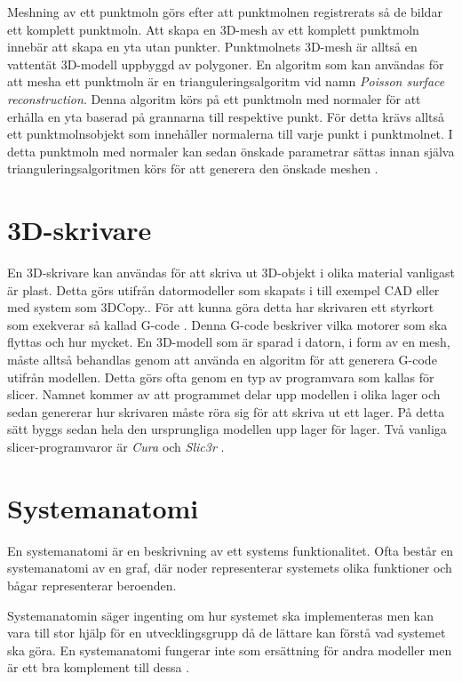 Meshning av ett punktmoln görs efter att punktmolnen registrerats så de bildar ett komplett punktmoln. Att skapa en 3D-mesh av ett komplett punktmoln innebär att skapa en yta utan punkter. Punktmolnets 3D-mesh är alltså en vattentät 3D-modell uppbyggd av polygoner. En algoritm som kan användas för att mesha ett punktmoln är en trianguleringsalgoritm vid namn \textit{Poisson surface reconstruction}. Denna algoritm körs på ett punktmoln med normaler för att erhålla en yta baserad på grannarna till respektive punkt. För detta krävs alltså ett punktmolnsobjekt som innehåller normalerna till varje punkt i punktmolnet. I detta punktmoln med normaler kan sedan önskade parametrar sättas innan själva trianguleringsalgoritmen körs för att generera den önskade meshen \cite{pcl_surface_reconstruction}\cite{pcl_triangulation_algorithm}. 


\section{3D-skrivare}
En 3D-skrivare kan användas för att skriva ut 3D-objekt i olika material vanligast är plast. Detta görs utifrån datormodeller som skapats i till exempel CAD eller med system som 3DCopy.. För att kunna göra detta har skrivaren ett styrkort som exekverar så kallad G-code \cite{gcode}. Denna G-code beskriver vilka motorer som ska flyttas och hur mycket. En 3D-modell som är sparad i datorn, i form av en mesh, måste alltså behandlas genom att använda en algoritm för att generera G-code utifrån modellen. Detta görs ofta genom en typ av programvara som kallas för slicer. Namnet kommer av att programmet delar upp modellen i olika lager och sedan genererar hur skrivaren måste röra sig för att skriva ut ett lager. På detta sätt byggs sedan hela den ursprungliga modellen upp lager för lager. Två vanliga slicer-programvaror är \textit{Cura} \cite{cura} och \textit{Slic3r} \cite{slic3r}.

\section{Systemanatomi}
En systemanatomi är en beskrivning av ett systems funktionalitet. Ofta består en systemanatomi av en graf, där noder representerar systemets olika funktioner och bågar representerar beroenden. 

Systemanatomin säger ingenting om hur systemet ska implementeras men kan vara till stor hjälp för en utvecklingsgrupp då de lättare kan förstå vad systemet ska göra. En systemanatomi fungerar inte som ersättning för andra modeller men är ett bra komplement till dessa \cite{system_anatomy}.

